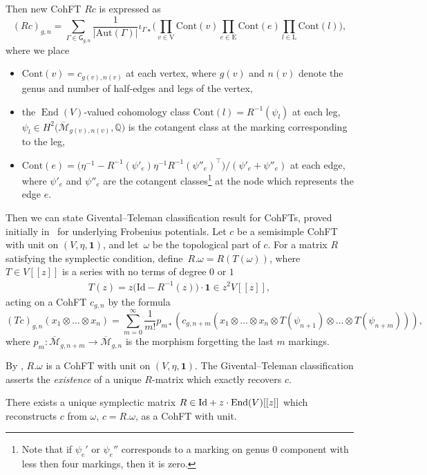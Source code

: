 \documentclass[10pt,a4paper]{amsart}
\def\End{{\rm End}}
\def\oM{\overline{\mathcal{M}}}
\def\b1{{\mathbf 1}}
\def\E{\mathrm{E}}
\def\L{\mathrm{L}}
\def\V{\mathrm{V}}
\numberwithin{equation}{section}
\begin{document}
Then new CohFT $Rc$ is expressed as
\[%
(Rc)_{g, n}=
\sum_{\Gamma\in\mathsf{G}_{g,n}} \frac{1}{|\mathrm{Aut}(\Gamma)|} \iota_{\Gamma \star} \biggl(
\prod_{v\in \V}\mathrm{Cont}(v)\prod_{e\in \E}\mathrm{Cont}(e)
\prod_{l\in \L}\mathrm{Cont}(l)
 \biggr) ,
 \]
 where we place
\begin{itemize}\itemsep=0pt
\item [(i)]
$\mathrm{Cont}(v)=c_{g(v), n(v)}$
at each vertex, where $g(v)$ and $n(v)$ denote the genus and number of half-edges and legs of the vertex,
\item [(ii)] the $\operatorname{End}(V)$-valued cohomology class
$\mathrm{Cont}(l)=R^{-1}(\psi_l)$
at each leg,
$\psi_l\!\in\! H^2\big(\oM_{g(v),n(v)},\mathbb{Q}\big)$
is the cotangent class at the marking corresponding to the leg,
\item [(iii)]
$\mathrm{Cont}(e)=\bigl(\eta^{-1}-R^{-1}(\psi'_e)\eta^{-1} R^{-1}(\psi''_e)^{\top}\bigr)/(\psi'_e+\psi''_e)$
at each edge,
where $\psi'_e$ and $\psi''_e$ are the cotangent classes\footnote{Note that if $\psi_e'$ or $\psi_e''$ corresponds to a marking on genus 0 component with less then four markings, then it is zero.} at the node which represents the edge $e$.
\end{itemize}
Then we can state Givental--Teleman classification result for CohFTs, proved initially in~\cite{T} for underlying Frobenius potentials.
Let $c$ be a semisimple CohFT with unit on $(V, \eta,\b1)$, and
let~$\omega$ be the topological part of $c$.
For a matrix $R$ satisfying the symplectic condition, define~${R.\omega = R(T(\omega))}$,
where $T\in V[[z]]$
is a series with no terms of degree $0$ or $1$
\begin{align*}
T(z)=z\big(\mathrm{Id}-R^{-1}(z)\big)\cdot \b1\in z^2V[[z]],
\end{align*}
acting on a CohFT $c_{g,n}$ by the formula
\begin{equation*}
(Tc)_{g, n} (x_1\otimes \dots \otimes x_n)=\sum_{m=0}^{\infty} \frac{1}{m!} p_{m*}
(c_{g, n+m}(x_1\otimes \dots \otimes x_n \otimes T(\psi_{n+1})\otimes \dots \otimes T(\psi_{n+m})))
 ,
\end{equation*}
where $p_{m}\colon \oM_{g, n+m}\to \oM_{g, n}$ is the morphism forgetting the last $m$ markings.

By \cite[Proposition 2.12]{PPZ}, $R.\omega$ is a CohFT with unit on $(V,\eta, \b1)$.
The Givental--Teleman classification asserts
the {\em existence} of a unique $R$-matrix which exactly
recovers $c$.

\begin{theorem*}[Teleman]
There exists a unique symplectic matrix
$R\in \mathrm{Id}+z\cdot \End (V)[[z]]$
which reconstructs $c$ from $\omega$,
$c=R.\omega $, as a CohFT with unit.
\end{theorem*}
\end{document}

